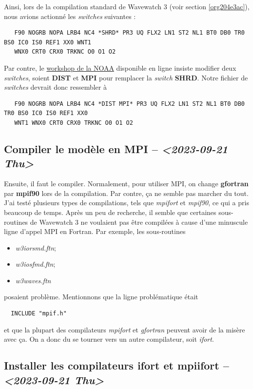\documentclass[10pt]{article}
\numberwithin{equation}{section}
\begin{document}
Ainsi, lors de la compilation standard de Wavewatch 3 (voir section \ref{org204e3ac}), nous avions actionné les \emph{switches} suivantes : 
\begin{verbatim}
   F90 NOGRB NOPA LRB4 NC4 *SHRD* PR3 UQ FLX2 LN1 ST2 NL1 BT0 DB0 TR0 BS0 IC0 IS0 REF1 XX0 WNT1
   WNX0 CRT0 CRX0 TRKNC O0 O1 O2
\end{verbatim}

Par contre, le \href{https://polar.ncep.noaa.gov/waves/workshop/pdfs/WW3-workshop-exercises-day4-MPI.pdf}{workshop de la NOAA} disponible en ligne insiste modifier deux \emph{switches}, soient \textbf{DIST} et \textbf{MPI} pour remplacer la \emph{switch} \textbf{SHRD}.
Notre fichier de \emph{switches} devrait donc ressembler à
\begin{verbatim}
   F90 NOGRB NOPA LRB4 NC4 *DIST MPI* PR3 UQ FLX2 LN1 ST2 NL1 BT0 DB0 TR0 BS0 IC0 IS0 REF1 XX0
   WNT1 WNX0 CRT0 CRX0 TRKNC O0 O1 O2
\end{verbatim}

\subsection{Compiler le modèle en MPI -- \textit{<2023-09-21 Thu>}}
\label{sec:org7a421f1}
Ensuite, il faut le compiler.
Normalement, pour utiliser MPI, on change \textbf{gfortran} par \textbf{mpif90} lors de la compilation.
Par contre, ça ne semble pas marcher du tout.
J'ai testé plusieurs types de compilations, tels que \emph{mpifort} et \emph{mpif90}, ce qui a pris beaucoup de temps.
Après un peu de recherche, il semble que certaines sous-routines de Wavewatch 3 ne voulaient pas être compilées à cause d'une minuscule ligne d'appel MPI en Fortran.
Par exemple, les sous-routines
\begin{itemize}
\item \emph{w3iorsmd.ftn};
\item \emph{w3iosfmd.ftn};
\item \emph{w3waves.ftn}
\end{itemize}
posaient problème.
Mentionnons que la ligne problématique était
\begin{verbatim}
  INCLUDE "mpif.h"
\end{verbatim}
et que la plupart des compilateurs \emph{mpifort} et \emph{gfortran} peuvent avoir de la misère avec ça.
On a donc du se tourner vers un autre compilateur, soit \emph{ifort}. 


\subsection{Installer les compilateurs ifort et mpiifort -- \textit{<2023-09-21 Thu>}}
\label{sec:org56142db}
\end{document}
